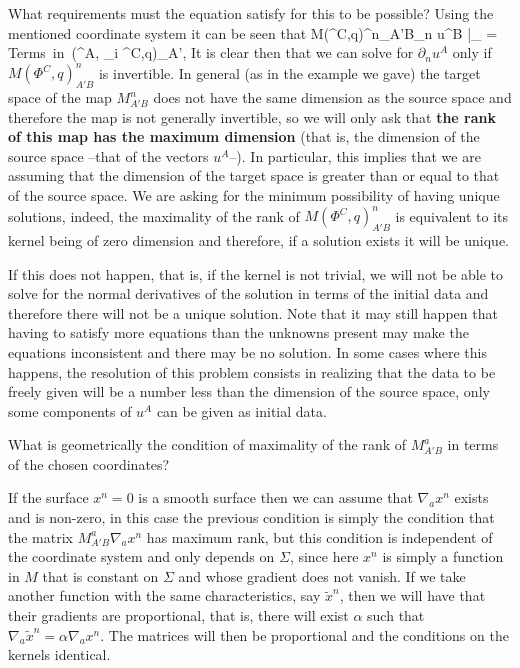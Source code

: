 What requirements must the equation satisfy for this to be possible?
Using the mentioned coordinate system it can be seen that
\beq M(\Phi^C,q)^n_{A'B}\partial_n u^B |_{\Sigma} = \mbox{Terms in }(\Phi^A,
\partial_i \Phi^C,q)_{A'},
\eeq
It is clear then that we can solve for $\partial_n u^A$ only if $M(\Phi^C,q)^n_{A'B}$ is invertible. In general (as in the example we gave) the target space of the map $M^n_{A'B}$ does not have the same dimension as the source space and therefore the map is not generally invertible, so we will only ask that {\bf the rank of this map has the maximum dimension} (that is, the dimension of the source space --that of the vectors $u^A$--). In particular, this implies that we are assuming that the dimension of the target space is greater than or equal to that of the source space. We are asking for the minimum possibility of having unique solutions, indeed, the maximality of the rank of $M(\Phi^C,q)^n_{A'B}$ is equivalent to its kernel being of zero dimension and therefore, if a solution exists it will be unique.

If this does not happen, that is, if the kernel is not trivial, we will not be able to solve for the normal derivatives of the solution in terms of the initial data and therefore there will not be a unique solution. Note that it may still happen that having to satisfy more equations than the unknowns present may make the equations inconsistent and there may be no solution. In some cases where this happens, the resolution of this problem consists in realizing that the data to be freely given will be a number less than the dimension of the source space, only some components of $u^A$ can be given as initial data.

What is geometrically the condition of maximality of the rank of $M^a_{A'B}$ in terms of the chosen coordinates?

If the surface $x^n = 0$ is a smooth surface then we can assume that $\nabla_a x^n$ exists and is non-zero, in this case the previous condition is simply the condition that the matrix $ M^a_{A'B}\nabla_ax^n$ has maximum rank, but this condition is independent of the coordinate system and only depends on $\Sigma$, since here $x^n$ is simply a function in $M$ that is constant on $\Sigma$ and whose gradient does not vanish. 
If we take another function with the same characteristics, say $\tilde{x}^n$, then we will have that their gradients are proportional, that is, there will exist $\alpha$ such that $\nabla_a \tilde{x}^n = \alpha \nabla_a x^n$. The matrices will then be proportional and the conditions on the kernels identical.


